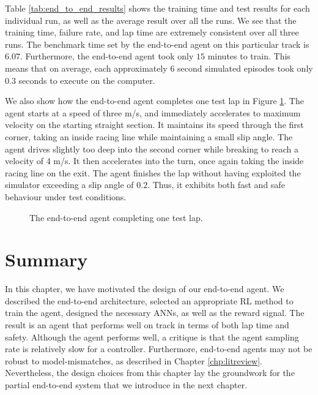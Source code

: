 Table \ref{tab:end_to_end_results} shows the training time and test results for each individual run, as well as the average result over all the runs. 
We see that the training time, failure rate, and lap time are extremely consistent over all three runs.
The benchmark time set by the end-to-end agent on this particular track is $6.07$.
Furthermore, the end-to-end agent took only $15$ minutes to train.
This means that on average, each approximately $6$ second simulated episodes took only $0.3$ seconds to execute on the computer. 



We also show how the end-to-end agent completes one test lap in Figure \ref{fig:end_to_end_lap}.
The agent starts at a speed of three m/s, and immediately accelerates to maximum velocity on the starting straight section.
It maintains its speed through the first corner, taking an inside racing line while maintaining a small slip angle.
The agent drives slightly too deep into the second corner while breaking to reach a velocity of 4 m/s.
It then accelerates into the turn, once again taking the inside racing line on the exit.
The agent finishes the lap without having exploited the simulator exceeding a slip angle of $0.2$.
Thus, it exhibits both fast and safe behaviour under test conditions.

\begin{figure}[htb!]
    \centering
    
    \caption[The end-to-end agent completing one test lap]{The end-to-end agent completing one test lap.}
    \label{fig:end_to_end_lap}
\end{figure}

\section{Summary}
In this chapter, we have motivated the design of our end-to-end agent.
We described the end-to-end architecture, selected an appropriate RL method to train the agent, designed the necessary ANNs, as well as the reward signal.
The result is an agent that performs well on track in terms of both lap time and safety.
Although the agent performs well, a critique is that the agent sampling rate is relatively slow for a controller.
Furthermore, end-to-end agents may not be robust to model-mismatches, as described in Chapter \ref{chp:litreview}.
Nevertheless, the design choices from this chapter lay the groundwork for the partial end-to-end system that we introduce in the next chapter.

